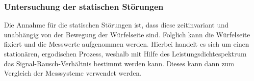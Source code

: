 \subsubsection{Untersuchung der statischen Störungen}
Die Annahme für die statischen Störungen ist, dass diese zeitinvariant und unabhängig von der Bewegung der Würfelseite sind. Folglich kann die Würfelseite fixiert und die Messwerte aufgenommen werden. Hierbei handelt es sich um einen stationären, ergodischen Prozess, weshalb mit Hilfe des Leistungsdichtespektrum das Signal-Rausch-Verhältnis bestimmt werden kann. Dieses kann dann zum Vergleich der Messsysteme verwendet werden.